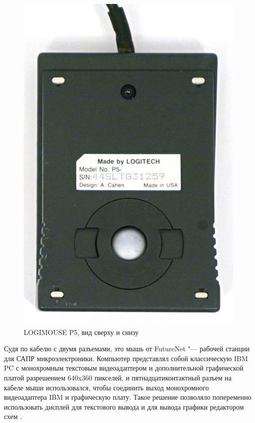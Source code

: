 \documentclass[11pt, a4paper]{article}
\begin{document}
\begin{figure}[h]
    \includegraphics[scale=0.4]{1983_logitech_logimouse_p5/bottom_30.jpg}
    \caption{LOGIMOUSE P5, вид сверху и снизу}
    \label{fig:LogimouseP5TopAndBottom}
\end{figure}

Судя по кабелю с двумя разъемами, это мышь от FutureNet "--- рабочей станции для САПР микроэлектроники. Компьютер представлял собой классическую IBM PC с монохромным текстовым видеоадаптером и дополнительной графической платой разрешением 640x360 пикселей, и пятнадцатиконтактный разъем на кабеле мыши использовался, чтобы соединить выход монохромного видеоадаптера IBM и графическую плату. Такое решение позволяло попеременно использовать дисплей для текстового вывода и для вывода графики редактором схем \cite{futurenet}.
\end{document}
